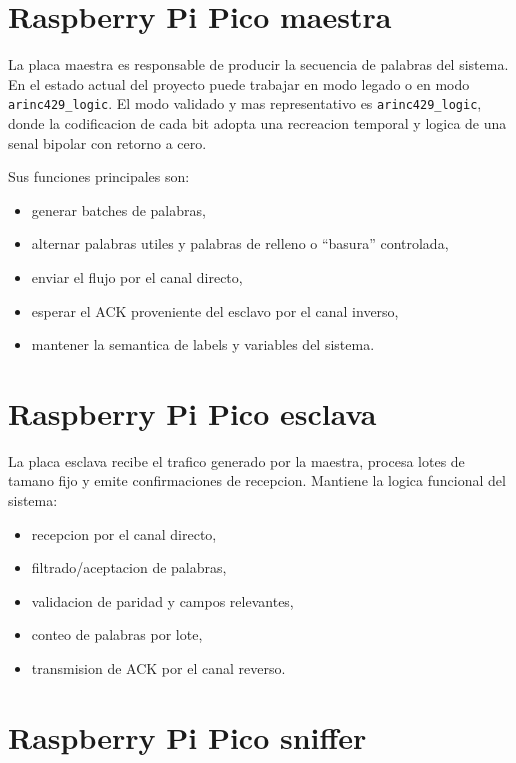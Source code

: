 \documentclass[12pt,a4paper]{report}
\begin{document}
\section{Raspberry Pi Pico maestra}

La placa maestra es responsable de producir la secuencia de palabras del sistema. En el estado actual del proyecto puede trabajar en modo legado o en modo \texttt{arinc429\_logic}. El modo validado y mas representativo es \texttt{arinc429\_logic}, donde la codificacion de cada bit adopta una recreacion temporal y logica de una senal bipolar con retorno a cero.

Sus funciones principales son:

\begin{itemize}
    \item generar batches de palabras,
    \item alternar palabras utiles y palabras de relleno o ``basura'' controlada,
    \item enviar el flujo por el canal directo,
    \item esperar el ACK proveniente del esclavo por el canal inverso,
    \item mantener la semantica de labels y variables del sistema.
\end{itemize}

\section{Raspberry Pi Pico esclava}

La placa esclava recibe el trafico generado por la maestra, procesa lotes de tamano fijo y emite confirmaciones de recepcion. Mantiene la logica funcional del sistema:

\begin{itemize}
    \item recepcion por el canal directo,
    \item filtrado/aceptacion de palabras,
    \item validacion de paridad y campos relevantes,
    \item conteo de palabras por lote,
    \item transmision de ACK por el canal reverso.
\end{itemize}

\section{Raspberry Pi Pico sniffer}
\end{document}
